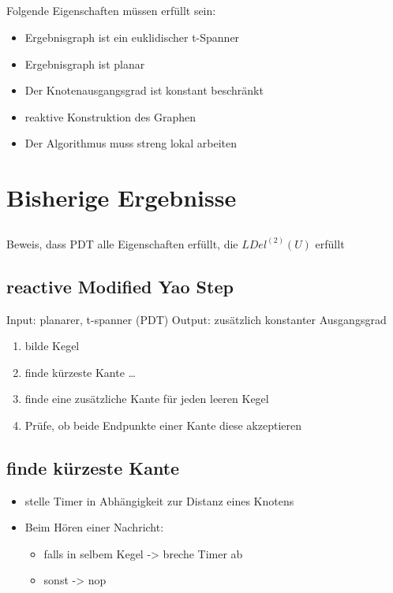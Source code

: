 \documentclass[compress]{beamer}
\begin{document}
\subsection{}
\begin{frame}
Folgende Eigenschaften müssen erfüllt sein:
\begin{itemize}
  \item Ergebnisgraph ist ein euklidischer t-Spanner
  \item Ergebnisgraph ist planar
  \item Der Knotenausgangsgrad ist konstant beschränkt
  \item reaktive Konstruktion des Graphen
  \item Der Algorithmus muss streng lokal arbeiten
\end{itemize}
\end{frame}



\section{Bisherige Ergebnisse}
\subsection{}
\begin{frame}
	Beweis, dass PDT alle Eigenschaften erfüllt, die $LDel^{(2)}(U) $ erfüllt 
\end{frame}

\subsection{reactive Modified Yao Step}
\begin{frame}
Input: planarer, t-spanner (PDT)
Output: zusätzlich konstanter Ausgangsgrad
	\begin{enumerate}
		\item bilde Kegel
		\item finde kürzeste Kante \ldots
		\item finde eine zusätzliche Kante für jeden leeren Kegel
		\item Prüfe, ob beide Endpunkte einer Kante diese akzeptieren
	\end{enumerate}
\end{frame}

\subsection{finde kürzeste Kante}
\begin{frame}
\begin{itemize}
	\item stelle Timer in Abhängigkeit zur Distanz eines Knotens
	\item Beim Hören einer Nachricht:
	\begin{itemize}
		\item falls in selbem Kegel -> breche Timer ab
		\item sonst -> nop
	\end{itemize}
\end{itemize}
\end{frame}
\end{document}
